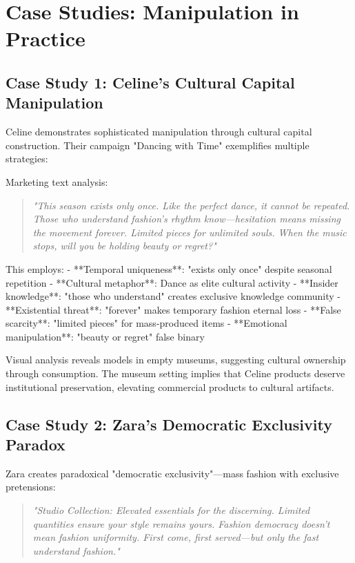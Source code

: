 \section{Case Studies: Manipulation in Practice}
\label{sec:fashion_cases}

\subsection{Case Study 1: Celine's Cultural Capital Manipulation}

Celine demonstrates sophisticated manipulation through cultural capital construction. Their campaign "Dancing with Time" exemplifies multiple strategies:

Marketing text analysis:
\begin{quote}
\textit{"This season exists only once. Like the perfect dance, it cannot be repeated. Those who understand fashion's rhythm know—hesitation means missing the movement forever. Limited pieces for unlimited souls. When the music stops, will you be holding beauty or regret?"}
\end{quote}

This employs:
- **Temporal uniqueness**: "exists only once" despite seasonal repetition
- **Cultural metaphor**: Dance as elite cultural activity
- **Insider knowledge**: "those who understand" creates exclusive knowledge community
- **Existential threat**: "forever" makes temporary fashion eternal loss
- **False scarcity**: "limited pieces" for mass-produced items
- **Emotional manipulation**: "beauty or regret" false binary

Visual analysis reveals models in empty museums, suggesting cultural ownership through consumption. The museum setting implies that Celine products deserve institutional preservation, elevating commercial products to cultural artifacts.

\subsection{Case Study 2: Zara's Democratic Exclusivity Paradox}

Zara creates paradoxical "democratic exclusivity"—mass fashion with exclusive pretensions:

\begin{quote}
\textit{"Studio Collection: Elevated essentials for the discerning. Limited quantities ensure your style remains yours. Fashion democracy doesn't mean fashion uniformity. First come, first served—but only the fast understand fashion."}
\end{quote}


